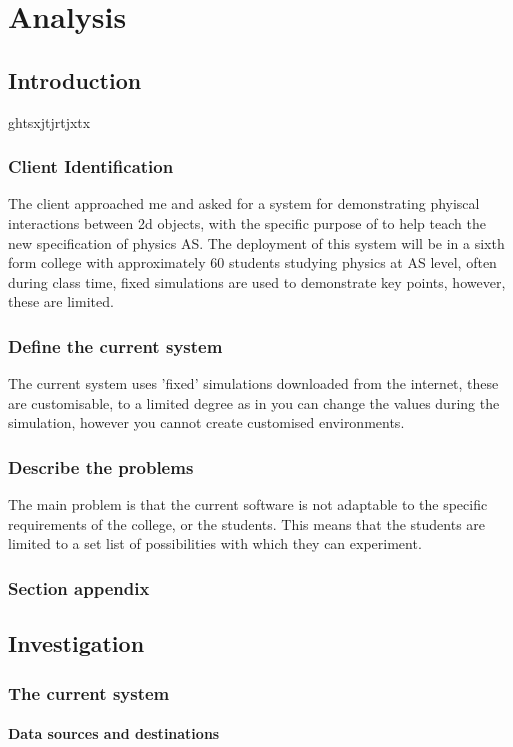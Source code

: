 \chapter{Analysis}

\section{Introduction}
ghtsxjtjrtjxtx
\subsection{Client Identification}
The client approached me and asked for a system for demonstrating phyiscal interactions between 2d objects, with the specific purpose of to help teach the new specification of physics AS. The deployment of this system will be in a sixth form college with approximately 60 students studying physics at AS level, often during class time, fixed simulations are used to demonstrate key points, however, these are limited.
\subsection{Define the current system}
The current system uses 'fixed' simulations downloaded from the internet, these are customisable, to a limited degree as in you can change the values during the simulation, however you cannot create customised environments.
\subsection{Describe the problems}
The main problem is that the current software is not adaptable to the specific requirements of the college, or the students. This means that the students are limited to a set list of possibilities with which they can experiment.
\subsection{Section appendix}

\section{Investigation}

\subsection{The current system}

\subsubsection{Data sources and destinations}

